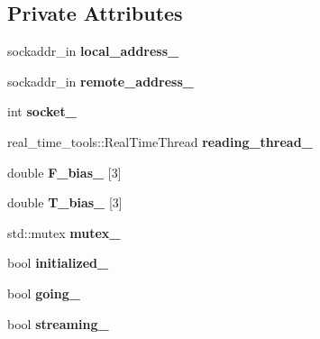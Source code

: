 \subsection*{Private Attributes}
\begin{DoxyCompactItemize}
\item 
\mbox{\label{classati__ft__sensor_1_1AtiFTSensor_adf13f1b427343f60330498ca0e98b9ea}} 
sockaddr\+\_\+in {\bfseries local\+\_\+address\+\_\+}
\item 
\mbox{\label{classati__ft__sensor_1_1AtiFTSensor_a6fc5b75e8a26437b6697862400c90690}} 
sockaddr\+\_\+in {\bfseries remote\+\_\+address\+\_\+}
\item 
\mbox{\label{classati__ft__sensor_1_1AtiFTSensor_affe56e51dc6cae8a4b456abb4db7fa35}} 
int {\bfseries socket\+\_\+}
\item 
\mbox{\label{classati__ft__sensor_1_1AtiFTSensor_ad0dde98310e810e75a5d1e03344ac3c5}} 
real\+\_\+time\+\_\+tools\+::\+Real\+Time\+Thread {\bfseries reading\+\_\+thread\+\_\+}
\item 
\mbox{\label{classati__ft__sensor_1_1AtiFTSensor_a36113d47f1a7c97f58c18d03c99da63c}} 
double {\bfseries F\+\_\+bias\+\_\+} \mbox{[}3\mbox{]}
\item 
\mbox{\label{classati__ft__sensor_1_1AtiFTSensor_a02280dd5595224c64b3031f79219a209}} 
double {\bfseries T\+\_\+bias\+\_\+} \mbox{[}3\mbox{]}
\item 
\mbox{\label{classati__ft__sensor_1_1AtiFTSensor_a8513adb153671c83f8924c940a23791a}} 
std\+::mutex {\bfseries mutex\+\_\+}
\item 
\mbox{\label{classati__ft__sensor_1_1AtiFTSensor_ada2c116afa79f3fff2885887cf3155f3}} 
bool {\bfseries initialized\+\_\+}
\item 
\mbox{\label{classati__ft__sensor_1_1AtiFTSensor_a5b38378ea71b88a534959b165195778b}} 
bool {\bfseries going\+\_\+}
\item 
\mbox{\label{classati__ft__sensor_1_1AtiFTSensor_a82c97328a137772d0a1dac5d55793199}} 
bool {\bfseries streaming\+\_\+}
\end{DoxyCompactItemize}
